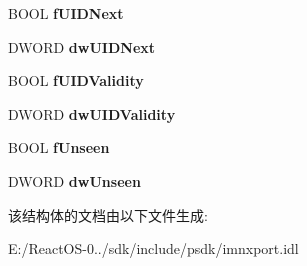 \begin{DoxyCompactItemize}
B\+O\+OL {\bfseries f\+U\+I\+D\+Next}
\item 
\mbox{\label{struct_i_i_m_a_p_callback_1_1tag_i_m_a_p___s_t_a_t_u_s___r_e_s_p_o_n_s_e_a778d50d2dbbd8ed07f5ee5579bcde352}} 
D\+W\+O\+RD {\bfseries dw\+U\+I\+D\+Next}
\item 
\mbox{\label{struct_i_i_m_a_p_callback_1_1tag_i_m_a_p___s_t_a_t_u_s___r_e_s_p_o_n_s_e_afea3237641dec502cd347f604735237e}} 
B\+O\+OL {\bfseries f\+U\+I\+D\+Validity}
\item 
\mbox{\label{struct_i_i_m_a_p_callback_1_1tag_i_m_a_p___s_t_a_t_u_s___r_e_s_p_o_n_s_e_a87f617a764431dcd4f95dd2045064db7}} 
D\+W\+O\+RD {\bfseries dw\+U\+I\+D\+Validity}
\item 
\mbox{\label{struct_i_i_m_a_p_callback_1_1tag_i_m_a_p___s_t_a_t_u_s___r_e_s_p_o_n_s_e_a42d349dce9097561aa71761192aeaacb}} 
B\+O\+OL {\bfseries f\+Unseen}
\item 
\mbox{\label{struct_i_i_m_a_p_callback_1_1tag_i_m_a_p___s_t_a_t_u_s___r_e_s_p_o_n_s_e_a8aee8315a4c3f03409b9c0d3494e428c}} 
D\+W\+O\+RD {\bfseries dw\+Unseen}
\end{DoxyCompactItemize}


该结构体的文档由以下文件生成\+:\begin{DoxyCompactItemize}
\item 
E\+:/\+React\+O\+S-\/0../sdk/include/psdk/imnxport.\+idl\end{DoxyCompactItemize}
